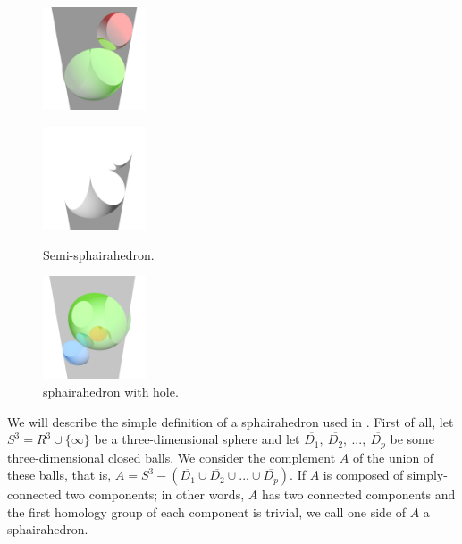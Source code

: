 \documentclass[suppldata, dvipdfmx]{interact}
\theoremstyle{plain}%
\theoremstyle{definition}
\theoremstyle{remark}
\theoremstyle{problemstyle}
\begin{document}
\begin{figure}[h!tbp]
 \begin{minipage}[t]{0.6\textwidth}
  \begin{minipage}[t]{0.3\textwidth}
   \centering
   \includegraphics[width=1.2in, height=1.2in,
   keepaspectratio]{./img/sphairahedralPrism/semiSphairaAll.png}
   \label{fig:semi-sphairaAll}
  \end{minipage}
  \hspace*{\fill}
  \begin{minipage}[t]{0.3\textwidth}
   \centering
   \includegraphics[width=1.2in, height=1.2in,
   keepaspectratio]{./img/sphairahedralPrism/semiSphairaHalf.png}
   \label{fig:semi-sphairaHalf}
  \end{minipage}
  \hspace*{\fill}
  \caption{Semi-sphairahedron.}
  \label{fig:semi-sphairahedron}
 \end{minipage}
 \begin{minipage}[t]{0.3\textwidth}
  \centering
 \includegraphics[width=1.2in, height=1.2in,
 keepaspectratio]{./img/sphairahedralPrism/hole.png}
 \caption{sphairahedron with hole.}
  \label{fig:brokenHole}
 \end{minipage}
\end{figure}

We will describe the simple definition of a sphairahedron used in \cite{bridges2018}.
First of all, let $S^3 = R^3 \cup \{\infty\}$ be a three-dimensional sphere and let
$\overline{D_1},~\overline{D_2},~...,~\overline{D_p}$ be some
three-dimensional closed balls.
We consider the complement $A$ of the union of these balls, that is,
$A = S^3 - (\overline{D_1} \cup \overline{D_2} \cup ... \cup \overline{D_p})$.
If $A$ is composed of simply-connected two components;
in other words, $A$ has two connected components and the first homology
group of each component is trivial, we call one side of $A$
a sphairahedron.
\end{document}
